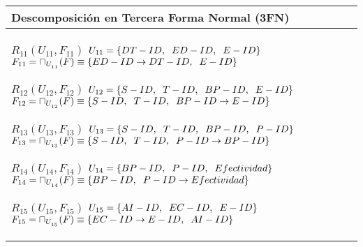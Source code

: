 \documentclass{report}
\begin{document}
    \begin{tabularx}{\textwidth}{|X|}
        \toprule
        \hfil \textbf{Descomposición en Tercera Forma Normal (3FN)} \\
        \midrule
        $ R_{11} ( U_{11} , F_{11} ) $ \newline 
        $ U_{11} = \{{DT-ID, \hspace{0.2cm}  ED-ID, \hspace{0.2cm}  E-ID}\} $ \newline 
        $ F_{11} = \sqcap_{U_{_{11}}}(F) \equiv \{ED-ID \rightarrow DT-ID, \hspace{0.2cm} E-ID \} $\newline 

        $ R_{12} ( U_{12} , F_{12} ) $ \newline 
        $ U_{12} = \{{S-ID, \hspace{0.2cm}  T-ID, \hspace{0.2cm}  BP-ID, \hspace{0.2cm}  E-ID}\} $ \newline 
        $ F_{12} = \sqcap_{U_{_{12}}}(F) \equiv \{S-ID, \hspace{0.2cm} T-ID, \hspace{0.2cm} BP-ID \rightarrow E-ID \} $\newline 

        $ R_{13} ( U_{13} , F_{13} ) $ \newline 
        $ U_{13} = \{{S-ID, \hspace{0.2cm}  T-ID, \hspace{0.2cm}  BP-ID, \hspace{0.2cm}  P-ID}\} $ \newline 
        $ F_{13} = \sqcap_{U_{_{13}}}(F) \equiv \{S-ID, \hspace{0.2cm} T-ID, \hspace{0.2cm} P-ID \rightarrow BP-ID \} $\newline 

        $ R_{14} ( U_{14} , F_{14} ) $ \newline 
        $ U_{14} = \{{BP-ID, \hspace{0.2cm}  P-ID, \hspace{0.2cm}  Efectividad}\} $ \newline 
        $ F_{14} = \sqcap_{U_{_{14}}}(F) \equiv \{BP-ID, \hspace{0.2cm} P-ID \rightarrow Efectividad \} $\newline 

        $ R_{15} ( U_{15} , F_{15} ) $ \newline 
        $ U_{15} = \{{AI-ID, \hspace{0.2cm}  EC-ID, \hspace{0.2cm}  E-ID}\} $ \newline 
        $ F_{15} = \sqcap_{U_{_{15}}}(F) \equiv \{EC-ID \rightarrow E-ID, \hspace{0.2cm} AI-ID \} $\newline 


\end{tabularx}
\end{document}
